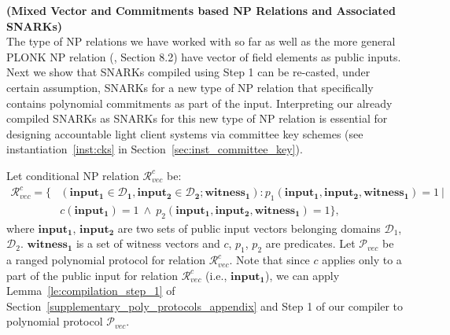 \noindent \textbf{(Mixed Vector and Commitments based NP Relations and Associated SNARKs)} \\

\noindent The type of NP relations we have worked with so far as well as the more general PLONK NP relation 
(\cite{plonk}, Section 8.2) have vector of field elements as public inputs. Next we show that SNARKs 
compiled using Step 1 can be re-casted, under certain assumption, SNARKs for a new type of NP relation 
that specifically contains polynomial commitments as part of the input. Interpreting 
our already compiled SNARKs as SNARKs for this new type of NP relation is essential for designing 
accountable light client systems via committee key schemes (see instantiation~\ref{inst:cks} 
in Section~\ref{sec:inst_committee_key}).  

\noindent Let conditional NP relation $\mathcal{R}_{\mathit{vec}}^c$  be:
\begin{align*}
\mathcal{R}_{\mathit{vec}}^c = \{&(\mathbf{input_1} \in \mathbf{\mathcal{D}_1}, \mathbf{input_2} \in\mathbf{\mathcal{D}_2}; \mathbf{witness_1}): p_1(\mathbf{input_1}, \mathbf{input_2}, \mathbf{witness_1}) = 1 \ |  \\ 
& c(\mathbf{input_1}) = 1 \ \wedge \ p_2(\mathbf{input_1}, \mathbf{input_2}, \mathbf{witness_1}) = 1 \},
\end{align*}
\noindent where $\mathbf{input_1}$, $\mathbf{input_2}$ are two sets of public input vectors 
belonging domains  $\mathcal{D}_1$, $\mathcal{D}_2$. $\mathbf{witness_1}$ is a set of witness vectors and $c$, $p_1$, $p_2$ are predicates. 
Let $\mathscr{P}_{\mathit{vec}}$ be a ranged polynomial protocol for relation $\mathcal{R}_{\mathit{vec}}^c$. Note that since $c$ applies 
only to a part of the public input for relation $\mathcal{R}_{\mathit{vec}}^c$ 
(i.e., $\mathbf{input_1}$), we can apply Lemma~\ref{le:compilation_step_1} of Section~\ref{supplementary_poly_protocols_appendix} and Step 1 
of our compiler to polynomial protocol $\mathscr{P}_{\mathit{vec}}$. \\

